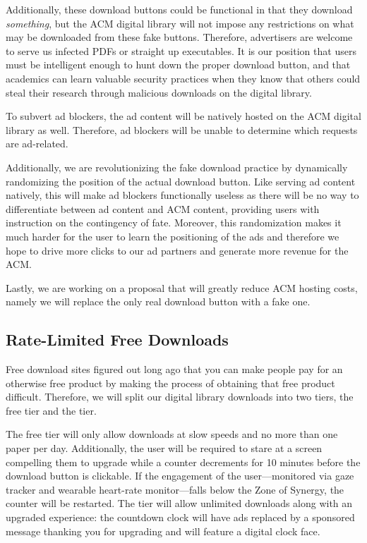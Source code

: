 Additionally, these download buttons could be functional in that they download
\textit{something}, but the ACM digital library will not impose any
restrictions on what may be downloaded from these fake buttons.
Therefore, advertisers are welcome to serve us infected PDFs or straight up
executables.
It is our position that users must be intelligent enough to hunt down the
proper download button, and that academics can learn valuable security
practices when they know that others could steal their research through
malicious downloads on the digital library.

To subvert ad blockers, the ad content will be natively hosted on the ACM
digital library as well.
Therefore, ad blockers will be unable to determine which requests are ad-related.

Additionally, we are revolutionizing the fake download practice by dynamically
randomizing the position of the actual download button.
Like serving ad content natively, this will make ad blockers functionally
useless as there will be no way to differentiate between ad content and ACM
content, providing users with instruction on the contingency of fate.
Moreover, this randomization makes it much harder for the user to learn the
positioning of the ads and therefore we hope to drive more clicks to our ad
partners and generate more revenue for the ACM.

Lastly, we are working on a proposal that will greatly reduce ACM hosting
costs, namely we  will replace the only real download button with a fake one.

\subsection{Rate-Limited Free Downloads}
\label{sec:limit}
Free download sites figured out long ago that you can make people pay for an
otherwise free product by making the process of obtaining that free product
difficult.
Therefore, we will split our digital library downloads into two tiers, the free
tier and the \premium tier.

The free tier will only allow downloads at slow speeds and no more than one
paper per day.
Additionally, the user will be required to stare at a screen compelling them to
upgrade while a counter decrements for 10 minutes before the download button is
clickable.
If the engagement of the user---monitored via gaze tracker and wearable
heart-rate monitor---falls below the Zone of Synergy\texttrademark, the counter will be restarted.
The \premium tier will allow unlimited downloads along with an upgraded
experience: the countdown clock will have ads replaced by a sponsored message
thanking you for upgrading and will feature a \premium digital clock face.

